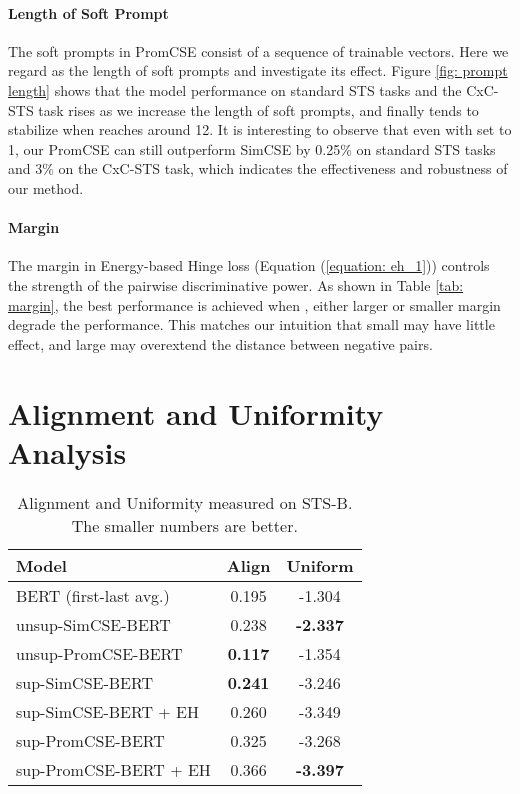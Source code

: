 \documentclass[11pt]{article}
\begin{document}
\paragraph{Length of Soft Prompt}
The soft prompts in PromCSE consist of a sequence of  trainable vectors. Here we regard  as the length of soft prompts and investigate its effect.
Figure \ref{fig: prompt length} shows that the model performance on standard STS tasks and the CxC-STS task rises as we increase the length of soft prompts, and finally tends to stabilize when  reaches around 12.
It is interesting to observe that even with  set to 1, our PromCSE can still outperform SimCSE by 0.25\% on standard STS tasks and 3\% on the CxC-STS task, which indicates the effectiveness and robustness of our method. 

\paragraph{Margin }
The margin  in Energy-based Hinge loss (Equation (\ref{equation: eh_1})) controls the strength of the pairwise discriminative power. As shown in Table \ref{tab: margin}, the best performance is achieved when , either larger or smaller margin degrade the performance.
This matches our intuition that small  may have little effect, and large  may overextend the distance between negative pairs.

\section{Alignment and Uniformity Analysis}

\begin{table}[t]
\small
\centering
\begin{tabular}{lcc}
\toprule
\textbf{Model} & \textbf{Align} & \textbf{Uniform}    \\
\midrule
BERT (first-last avg.)   & 0.195 & -1.304   \\
unsup-SimCSE-BERT   & 0.238 & \textbf{-2.337} \\
unsup-PromCSE-BERT  & \textbf{0.117} & -1.354 \\
\midrule
sup-SimCSE-BERT   & \textbf{0.241} & -3.246 \\
sup-SimCSE-BERT + EH   & 0.260 & -3.349 \\
sup-PromCSE-BERT  & 0.325 & -3.268 \\
sup-PromCSE-BERT + EH  & 0.366 & \textbf{-3.397} \\
\bottomrule
\end{tabular}
\caption{\label{tab: align}
Alignment and Uniformity measured on STS-B. The smaller numbers are better. 
}
\end{table}
\end{document}
